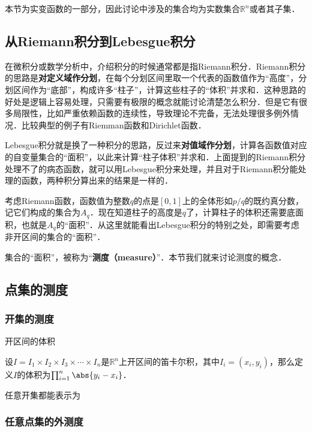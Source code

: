 


本节为实变函数的一部分，因此讨论中涉及的集合均为实数集合$\mathbb{R}^n$或者其子集．


\subsection{从Riemann积分到Lebesgue积分}


在微积分或数学分析中，介绍积分的时候通常都是指Riemann积分．Riemann积分的思路是\textbf{对定义域作分划}，在每个分划区间里取一个代表的函数值作为“高度”，分划区间作为“底部”，构成许多“柱子”，计算这些柱子的“体积”并求和．这种思路的好处是逻辑上容易处理，只需要有极限的概念就能讨论清楚怎么积分．但是它有很多局限性，比如严重依赖函数的连续性，导致理论不完备，无法处理很多例外情况．比较典型的例子有Riemman函数和Dirichlet函数．

Lebesgue积分就是换了一种积分的思路，反过来\textbf{对值域作分划}，计算各函数值对应的自变量集合的“面积”，以此来计算“柱子体积”并求和．上面提到的Riemann积分处理不了的病态函数，就可以用Lebesgue积分来处理，并且对于Riemann积分能处理的函数，两种积分算出来的结果是一样的．

考虑Riemann函数，函数值为整数$q$的点是$[0, 1]$上的全体形如$p/q$的既约真分数，记它们构成的集合为$A_q$．现在知道柱子的高度是$q$了，计算柱子的体积还需要底面积，也就是$A_q$的“面积”．从这里就能看出Lebesgue积分的特别之处，即需要考虑非开区间的集合的“面积”．

集合的“面积”，被称为“\textbf{测度（measure）}”．本节我们就来讨论测度的概念．



\subsection{点集的测度}

\subsubsection{开集的测度}

\begin{definition}{开区间的体积}\label{SetMet_def1}

设$I=I_1\times I_2\times I_3\times\cdots\times I_n$是$\mathbb{R}^n$上开区间的笛卡尔积，其中$I_i=(x_i, y_i)$，那么定义$I$的体积为$\prod_{i=1}^n \abs{y_i-x_i}$．

\end{definition}

任意开集都能表示为


\subsubsection{任意点集的外测度}




















